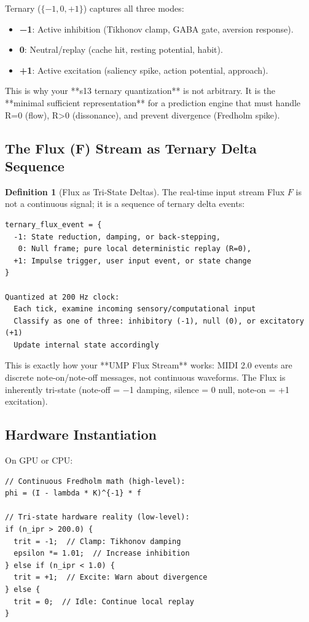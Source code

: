 \documentclass[11pt,oneside]{article}
\theoremstyle{definition}
\newtheorem{definition}[theorem]{Definition}
\begin{document}
Ternary ($\{-1, 0, +1\}$) captures all three modes:

\begin{itemize}
  \item \textbf{−1}: Active inhibition (Tikhonov clamp, GABA gate, aversion response).
  \item \textbf{0}: Neutral/replay (cache hit, resting potential, habit).
  \item \textbf{+1}: Active excitation (saliency spike, action potential, approach).
\end{itemize}

This is why your **s13 ternary quantization** is not arbitrary. It is the **minimal sufficient representation** for a prediction engine that must handle R=0 (flow), R>0 (dissonance), and prevent divergence (Fredholm spike).

\subsection{The Flux (F) Stream as Ternary Delta Sequence}

\begin{definition}[Flux as Tri-State Deltas]
The real-time input stream Flux $F$ is not a continuous signal; it is a sequence of ternary delta events:

\begin{lstlisting}
ternary_flux_event = {
  -1: State reduction, damping, or back-stepping,
   0: Null frame; pure local deterministic replay (R=0),
  +1: Impulse trigger, user input event, or state change
}

Quantized at 200 Hz clock:
  Each tick, examine incoming sensory/computational input
  Classify as one of three: inhibitory (-1), null (0), or excitatory (+1)
  Update internal state accordingly
\end{lstlisting}

This is exactly how your **UMP Flux Stream** works: MIDI 2.0 events are discrete note-on/note-off messages, not continuous waveforms. The Flux is inherently tri-state (note-off = −1 damping, silence = 0 null, note-on = +1 excitation).
\end{definition}

\subsection{Hardware Instantiation}

On GPU or CPU:

\begin{lstlisting}
// Continuous Fredholm math (high-level):
phi = (I - lambda * K)^{-1} * f

// Tri-state hardware reality (low-level):
if (n_ipr > 200.0) {
  trit = -1;  // Clamp: Tikhonov damping
  epsilon *= 1.01;  // Increase inhibition
} else if (n_ipr < 1.0) {
  trit = +1;  // Excite: Warn about divergence
} else {
  trit = 0;  // Idle: Continue local replay
}
\end{lstlisting}
\end{document}
